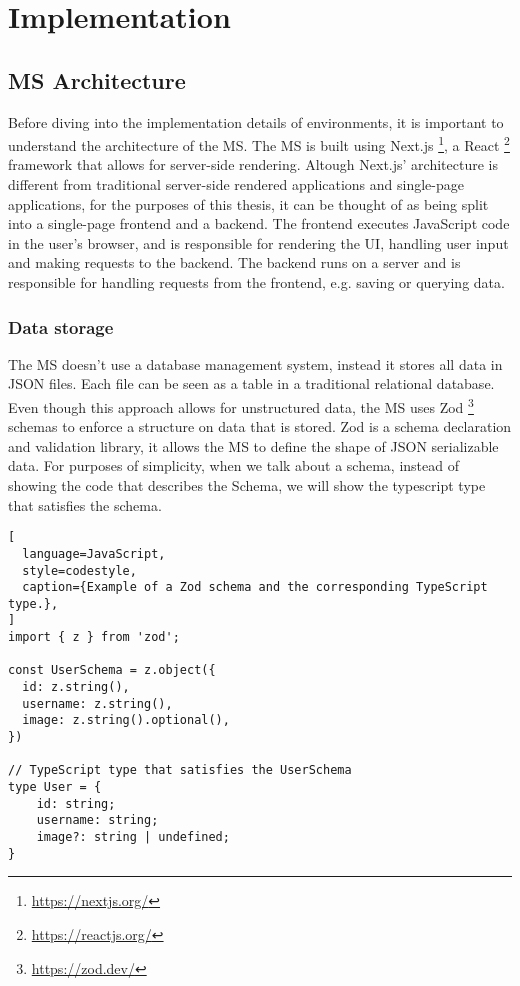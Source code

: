 \chapter{Implementation}
\label{cha:implementation}

\section {MS Architecture}

Before diving into the implementation details of environments, it is important to
understand the architecture of the MS.
The MS is built using Next.js \footnote{\url{https://nextjs.org/}}, a React \footnote{\url{https://reactjs.org/}}
framework that allows for server-side rendering.
Altough Next.js' architecture is different from traditional server-side rendered
applications and single-page applications,
for the purposes of this thesis,
it can be thought of as being split into a single-page frontend and a backend.
The frontend executes JavaScript code in the user's browser, and is
responsible for rendering the UI, handling user input and making requests to the backend.
The backend runs on a server and is responsible for handling requests from the frontend,
e.g. saving or querying data.

\subsection{Data storage}


The MS doesn't use a database management system, instead it stores all data in JSON files.
Each file can be seen as a table in a traditional relational database.
Even though this approach allows for unstructured data, the MS uses 
Zod \footnote{\url{https://zod.dev/}} schemas to enforce a structure on
data that is stored.
Zod is a schema declaration and validation library, it allows the MS to define the shape
of JSON serializable data.
For purposes of simplicity, when we talk about a schema, instead of showing the code that
describes the Schema, we will show the typescript type that satisfies the schema.

\begin{lstlisting}[
  language=JavaScript,
  style=codestyle,
  caption={Example of a Zod schema and the corresponding TypeScript type.},
]
import { z } from 'zod';

const UserSchema = z.object({
  id: z.string(),
  username: z.string(),
  image: z.string().optional(),
})

// TypeScript type that satisfies the UserSchema
type User = {
    id: string;
    username: string;
    image?: string | undefined;
}
\end{lstlisting}

